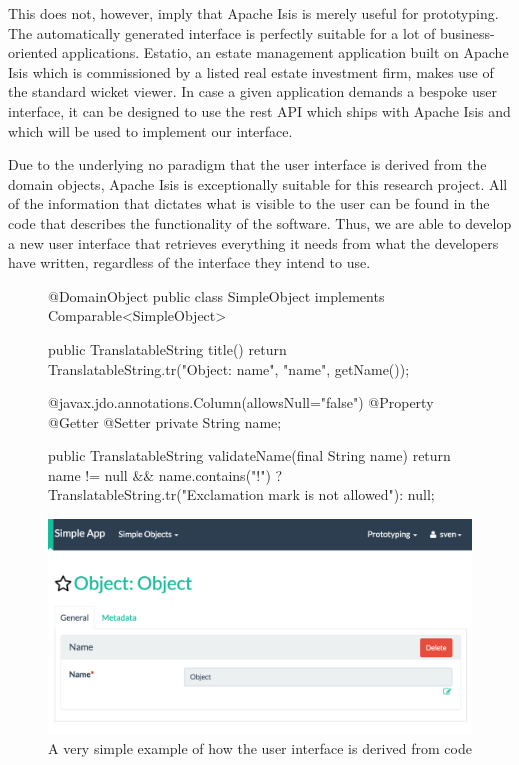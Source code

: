 This does not, however, imply that Apache Isis is merely useful for prototyping. The automatically generated interface is perfectly suitable for a lot of business-oriented applications. Estatio\cite{Estat40:online}, an estate management application built on Apache Isis which is commissioned by a listed real estate investment firm, makes use of the standard wicket viewer. In case a given application demands a bespoke user interface, it can be designed to use the \acrshort{rest} API which ships with Apache Isis and which will be used to implement our interface.

Due to the underlying \acrshort{no} paradigm that the user interface is derived from the domain objects, Apache Isis is exceptionally suitable for this research project. All of the information that dictates what is visible to the user can be found in the code that describes the functionality of the software. Thus, we are able to develop a new user interface that retrieves everything it needs from what the developers have written, regardless of the interface they intend to use.

\noindent
\begin{figure}
\begin{minipage}{.5\textwidth}
\begin{javacode}
@DomainObject
public class SimpleObject implements Comparable<SimpleObject> {
    public TranslatableString title() {
        return TranslatableString.tr("Object: {name}", "name", getName());
    }

    @javax.jdo.annotations.Column(allowsNull="false")
    @Property
    @Getter @Setter
    private String name;

    public TranslatableString validateName(final String name) {
        return name != null && name.contains("!") ?
            TranslatableString.tr("Exclamation mark is not allowed"): null;
    }
}
\end{javacode}
\end{minipage}
\begin{minipage}{.5\textwidth}
	\includegraphics[width=\textwidth]{figures/simpleobjectui}
\end{minipage}
\caption{A very simple example of how the user interface is derived from code}
\end{figure}

